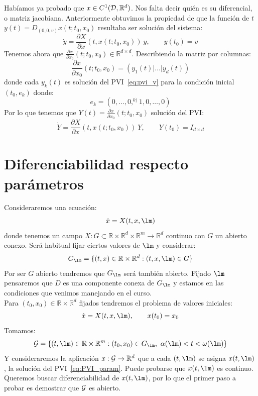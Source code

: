\noindent
Habíamos ya probado que $x\in C^1(\mathcal{D},\mathbb{R}^d)$. Nos falta decir quién es su diferencial, o matriz jacobiana. Anteriormente obtuvimos la propiedad de que la función de $t$ $y(t) = D_{(0,0,v)}x(t;t_0,x_0)$ resultaba ser solución del sistema:
\begin{equation}\label{eq:pvi_v}
    \dot{y} = \frac{\partial X}{\partial x}(t,x(t;t_0,x_0))\ y, \qquad y(t_0) = v
\end{equation}
Tenemos ahora que $\frac{\partial x}{\partial x_0}(t;t_0,x_0)\in \mathbb{R}^{d\times d}$. Describiendo la matriz por columnas:
\begin{equation*}
    \frac{\partial x}{\partial x_0}(t;t_0,x_0) = (y_1(t) | \ldots | y_d(t))
\end{equation*}
donde cada $y_k(t)$ es solución del PVI~\eqref{eq:pvi_v} para la condición inicial $(t_0,e_k)$ donde:
\begin{equation*}
    e_k = (0, \ldots, 0, ^{k)}1, 0, \ldots, 0)
\end{equation*}
Por lo que tenemos que $Y(t) = \frac{\partial x}{\partial x_0}(t;t_0,x_0)$ solución del PVI:
\begin{equation*}
    \dot{Y} = \frac{\partial X}{\partial x}(t,x(t;t_0,x_0))\ Y, \qquad Y(t_0) = I_{d\times d}
\end{equation*}

\section{Diferenciabilidad respecto parámetros} %
\noindent
Consideraremos una ecuación:
\begin{equation*}
    \dot{x} = X(t,x,\lm)
\end{equation*}
donde tenemos un campo $X:G\subset \mathbb{R}\times\mathbb{R}^d\times\mathbb{R}^m\to \mathbb{R}^d$ continuo con $G$ un abierto conexo. Será habitual fijar ciertos valores de $\lm$  y considerar:
\begin{equation*}
    G_\lm = \{(t,x)\in \mathbb{R}\times\mathbb{R}^d : (t,x,\lm)\in G\}
\end{equation*}
Por ser $G$ abierto tendremos que $G_\lm$ será también abierto. Fijado $\lm$ pensaremos que $D$ es una componente conexa de $G_\lm$ y estamos en las condiciones que venimos manejando en el curso.\\

\noindent
Para $(t_0,x_0)\in \mathbb{R}\times\mathbb{R}^d$ fijados tendremos el problema de valores iniciales:
\begin{equation}\label{eq:PVI_param}
    \dot{x} = X(t,x,\lm), \qquad x(t_0) = x_0
\end{equation}
Tomamos:
\begin{equation*}
    \cc{G} = \{(t,\lm)\in \mathbb{R}\times\mathbb{R}^m : (t_0,x_0)\in G_\lm,\ \alpha(\lm)<t<\omega(\lm)\}
\end{equation*}
Y consideraremos la aplicación $x:\mathcal{G}\to \mathbb{R}^d$ que a cada $(t,\lm)$ se asigna $x(t,\lm)$, la solución del PVI~\eqref{eq:PVI_param}. Puede probarse que $x(t,\lm)$ es continuo. Queremos buscar diferenciabilidad de $x(t,\lm)$, por lo que el primer paso a probar es demostrar que $\mathcal{G}$ es abierto.\\

